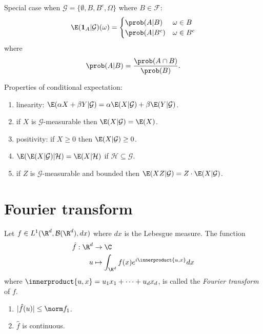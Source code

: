 \documentclass[a4paper]{article}
\renewcommand{\P}{\prob} %
\newcommand*{\ip}{\innerproduct} %
\begin{document}
\begin{remark}
  Special case when \(\mathcal G = \{\emptyset, B, B^c, \Omega\}\) where \(B \in \mathcal F\):
  \[
    \E(\mathbf 1_A | \mathcal G)(\omega) =
    \begin{cases}
      \P(A|B) & \omega \in B \\
      \P(A|B^c) & \omega \in B^c
    \end{cases}
  \]
  where
  \[
    \P(A|B) = \frac{\P(A \cap B)}{\P(B)}.
  \]
\end{remark}

\begin{proposition}
  Properties of conditional expectation:
  \begin{enumerate}
  \item linearity: \(\E(\alpha X + \beta Y | \mathcal G) = \alpha \E(X | \mathcal G) + \beta \E(Y | \mathcal G)\).
  \item if \(X\) is \(\mathcal G\)-measurable then \(\E(X | \mathcal G) = \E(X)\).
  \item positivity: if \(X \geq 0\) then \(\E(X | \mathcal G) \geq 0\).
  \item \(\E(\E(X | \mathcal G) | \mathcal H) = \E(X | \mathcal H)\) if \(\mathcal H \subseteq \mathcal G\).
  \item if \(Z\) is \(\mathcal G\)-measurable and bounded then \(\E(XZ| \mathcal G) = Z \cdot \E(X| \mathcal G)\).
  \end{enumerate}
\end{proposition}

\section{Fourier transform}

\begin{definition}
  Let \(f \in L^1(\R^d, \mathcal B(\R^d), dx)\) where \(dx\) is the Lebesgue measure. The function
  \begin{align*}
    \hat f: \R^d &\to \C \\
    u &\mapsto \int_{\R^d} f(x) e^{i \ip{u, x}} dx
  \end{align*}
  where \(\ip{u, x} = u_1x_1 + \dots + u_dx_d\), is called the \emph{Fourier transform} of \(f\).
\end{definition}

\begin{proposition}\leavevmode
  \begin{enumerate}
  \item \(|\hat f(u)| \leq \norm f_1\).
  \item \(\hat f\) is continuous. 
  \end{enumerate}
\end{proposition}
\end{document}
